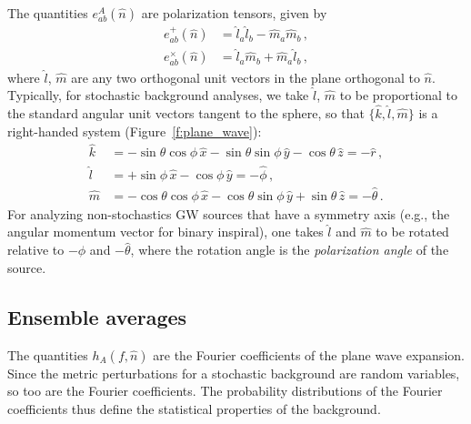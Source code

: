 \documentclass[11pt]{article}
\numberwithin{equation}{section}
\def\be{\begin{equation}}
\def\ee{\end{equation}}
\begin{document}
%
The quantities $e^A_{ab}(\hat n)$ are polarization
tensors, given by
%
\be
\begin{aligned}
e_{ab}^+(\hat n)
&=\hat l_a\hat l_b-\hat m_a\hat m_b\,,
\\
e_{ab}^\times(\hat n)
&=\hat l_a\hat m_b+\hat m_a\hat l_b\,,
\end{aligned}
\ee
%
where $\hat l$, $\hat m$ are any two orthogonal unit 
vectors in the plane orthogonal to $\hat n$.
Typically, for stochastic background analyses, 
we take $\hat l$, $\hat m$ to be proportional to 
the standard angular unit vectors tangent to the sphere,
so that $\{\hat k, \hat l, \hat m\}$ is a right-handed
system (Figure~\ref{f:plane_wave}):
%
\be
\begin{aligned}
\hat k
&=-\sin\theta\cos\phi\,\hat x
-\sin\theta\sin\phi\,\hat y
-\cos\theta\,\hat z
= -\hat r\,,
\\
\hat l
&=+\sin\phi\,\hat x
-\cos\phi\,\hat y
= -\hat\phi\,,
\\
\hat m
&=-\cos\theta\cos\phi\,\hat x
-\cos\theta\sin\phi\,\hat y
+\sin\theta\,\hat z 
= -\hat\theta\,.
\end{aligned}
\label{e:klm_def}
\ee
%
For analyzing non-stochastics GW sources that have 
a symmetry axis (e.g., the angular momentum 
vector for binary inspiral), one takes 
$\hat l$ and $\hat m$ to be rotated relative 
to $-\hat\phi$ and $-\hat\theta$, 
where the rotation angle is the 
{\em polarization angle} of the source.

\subsection{Ensemble averages}
\label{s:ensemble_averages}

The quantities $h_A(f,\hat n)$ are the Fourier 
coefficients of the plane wave expansion.
Since the metric perturbations 
for a stochastic background are random variables, 
so too are the 
Fourier coefficients.
The probability distributions of the Fourier coefficients
thus define the statistical properties of the background.
\end{document}

